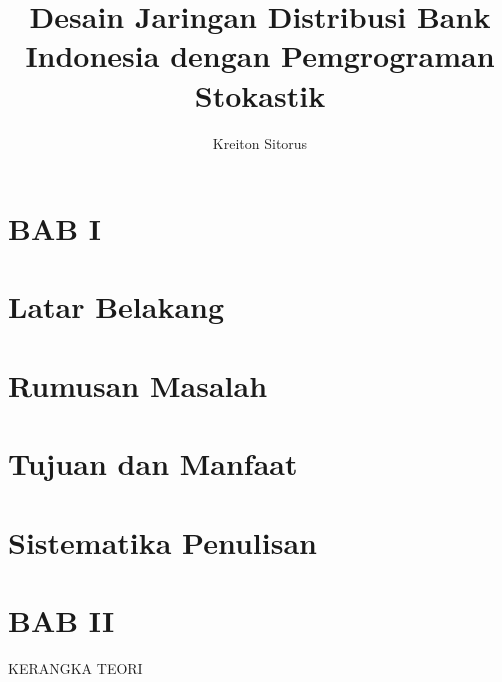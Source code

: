 \documentclass[]{article}
\title{Desain Jaringan Distribusi Bank Indonesia dengan Pemgrograman Stokastik}
\author{Kreiton Sitorus}
\begin{document}
\maketitle

\begin{abstract}

\end{abstract}

\section{BAB I}
\section{Latar Belakang}
\section{Rumusan Masalah}
\section{Tujuan dan Manfaat}
\section{Sistematika Penulisan}

\section{BAB II}{KERANGKA TEORI}
\end{document}
